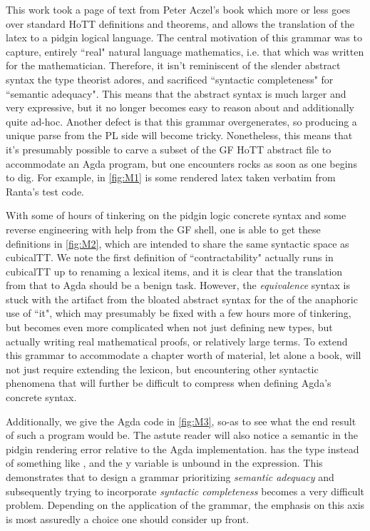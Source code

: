 This work took a page of text from Peter Aczel's book which more or less goes
over standard HoTT definitions and theorems, and allows the translation of the
latex to a pidgin logical language. The central motivation of this grammar was
to capture, entirely ``real" natural language mathematics, i.e. that which was
written for the mathematician. Therefore, it isn't reminiscent of the slender
abstract syntax the type theorist adores, and sacrificed ``syntactic
completeness" for ``semantic adequacy". This means that the abstract syntax is
much larger and very expressive, but it no longer becomes easy to reason about
and additionally quite ad-hoc. Another defect is that this grammar
overgenerates, so producing a unique parse from the PL side will become tricky.
Nonetheless, this means that it's presumably possible to carve a subset of the
GF HoTT abstract file to accommodate an Agda program, but one encounters rocks as soon
as one begins to dig. For example, in \autoref{fig:M1} is some rendered latex
taken verbatim from Ranta's test code.

With some of hours of tinkering on the pidgin logic concrete syntax and some
reverse engineering with help from the GF shell, one is able to get these
definitions in \autoref{fig:M2}, which are intended to share the same syntactic
space as cubicalTT. We note the first definition of ``contractability" actually
runs in cubicalTT up to renaming a lexical items, and it is clear that the
translation from that to Agda should be a benign task. However, the
\emph{equivalence} syntax is stuck with the artifact from the bloated abstract
syntax for the of the anaphoric use of ``it", which may presumably be fixed with
a few hours more of tinkering, but becomes even more complicated when not just
defining new types, but actually writing real mathematical proofs, or relatively
large terms. To extend this grammar to accommodate a chapter worth of material,
let alone a book, will not just require extending the lexicon, but encountering
other syntactic phenomena that will further be difficult to compress when
defining Agda's concrete syntax.



Additionally, we give the Agda code in \autoref{fig:M3}, so-as to see what the
end result of such a program would be. The astute reader will also notice a
semantic in the pidgin rendering error relative to the Agda implementation.
 has the type  instead of something like
, and the y variable is unbound in the 
expression. This demonstrates that to design a grammar prioritizing
\emph{semantic adequacy} and subsequently trying to incorporate \emph{syntactic
completeness} becomes a very difficult problem. Depending on the application of
the grammar, the emphasis on this axis is most assuredly a choice one should
consider up front.

